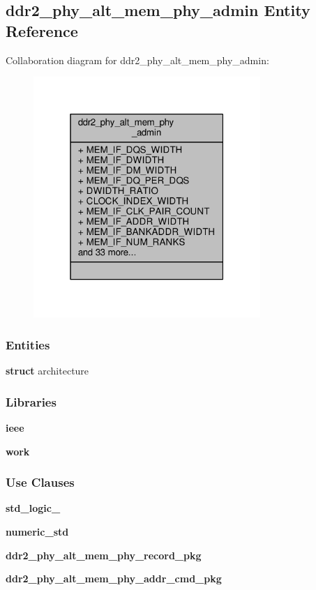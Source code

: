 \subsection{ddr2\+\_\+phy\+\_\+alt\+\_\+mem\+\_\+phy\+\_\+admin Entity Reference}
\label{classddr2__phy__alt__mem__phy__admin}


Collaboration diagram for ddr2\+\_\+phy\+\_\+alt\+\_\+mem\+\_\+phy\+\_\+admin\+:\nopagebreak
\begin{figure}[H]
\begin{center}
\leavevmode
\includegraphics[width=244pt]{da/de0/classddr2__phy__alt__mem__phy__admin__coll__graph}
\end{center}
\end{figure}
\subsubsection*{Entities}
\begin{DoxyCompactItemize}
\item 
{\bf struct} architecture
\end{DoxyCompactItemize}
\subsubsection*{Libraries}
 \begin{DoxyCompactItemize}
\item 
{\bf ieee} 
\item 
{\bf work} 
\end{DoxyCompactItemize}
\subsubsection*{Use Clauses}
 \begin{DoxyCompactItemize}
\item 
{\bf std\+\_\+logic\+\_}   
\item 
{\bf numeric\+\_\+std}   
\item 
{\bf ddr2\+\_\+phy\+\_\+alt\+\_\+mem\+\_\+phy\+\_\+record\+\_\+pkg}   
\item 
{\bf ddr2\+\_\+phy\+\_\+alt\+\_\+mem\+\_\+phy\+\_\+addr\+\_\+cmd\+\_\+pkg}   
\end{DoxyCompactItemize}
